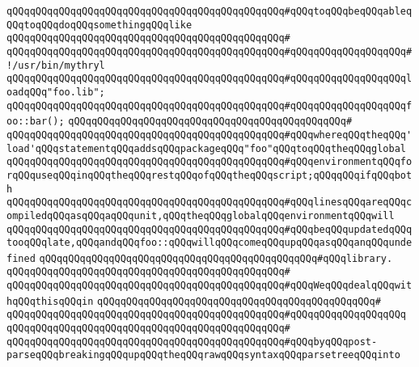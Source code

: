 \verb|qQQqqQQqqQQqqQQqqQQqqQQqqQQqqQQqqQQqqQQqqQQqqQQq#qQQqtoqQQqbeqQQqableqQQqtoqQQqdoqQQqsomethingqQQqlike|\newline
\verb|qQQqqQQqqQQqqQQqqQQqqQQqqQQqqQQqqQQqqQQqqQQqqQQq#|\newline
\verb|qQQqqQQqqQQqqQQqqQQqqQQqqQQqqQQqqQQqqQQqqQQqqQQq#qQQqqQQqqQQqqQQqqQQq#!/usr/bin/mythryl|\newline
\verb|qQQqqQQqqQQqqQQqqQQqqQQqqQQqqQQqqQQqqQQqqQQqqQQq#qQQqqQQqqQQqqQQqqQQqloadqQQq"foo.lib";|\newline
\verb|qQQqqQQqqQQqqQQqqQQqqQQqqQQqqQQqqQQqqQQqqQQqqQQq#qQQqqQQqqQQqqQQqqQQqfoo::bar();|\newline
\verb|qQQqqQQqqQQqqQQqqQQqqQQqqQQqqQQqqQQqqQQqqQQqqQQq#|\newline
\verb|qQQqqQQqqQQqqQQqqQQqqQQqqQQqqQQqqQQqqQQqqQQqqQQq#qQQqwhereqQQqtheqQQq'load'qQQqstatementqQQqaddsqQQqpackageqQQq"foo"qQQqtoqQQqtheqQQqglobal|\newline
\verb|qQQqqQQqqQQqqQQqqQQqqQQqqQQqqQQqqQQqqQQqqQQqqQQq#qQQqenvironmentqQQqforqQQquseqQQqinqQQqtheqQQqrestqQQqofqQQqtheqQQqscript;qQQqqQQqifqQQqboth|\newline
\verb|qQQqqQQqqQQqqQQqqQQqqQQqqQQqqQQqqQQqqQQqqQQqqQQq#qQQqlinesqQQqareqQQqcompiledqQQqasqQQqaqQQqunit,qQQqtheqQQqglobalqQQqenvironmentqQQqwill|\newline
\verb|qQQqqQQqqQQqqQQqqQQqqQQqqQQqqQQqqQQqqQQqqQQqqQQq#qQQqbeqQQqupdatedqQQqtooqQQqlate,qQQqandqQQqfoo::qQQqwillqQQqcomeqQQqupqQQqasqQQqanqQQqundefined|\newline
\verb|qQQqqQQqqQQqqQQqqQQqqQQqqQQqqQQqqQQqqQQqqQQqqQQq#qQQqlibrary.|\newline
\verb|qQQqqQQqqQQqqQQqqQQqqQQqqQQqqQQqqQQqqQQqqQQqqQQq#|\newline
\verb|qQQqqQQqqQQqqQQqqQQqqQQqqQQqqQQqqQQqqQQqqQQqqQQq#qQQqWeqQQqdealqQQqwithqQQqthisqQQqin|\newline
\verb|qQQqqQQqqQQqqQQqqQQqqQQqqQQqqQQqqQQqqQQqqQQqqQQq#|\newline
\verb|qQQqqQQqqQQqqQQqqQQqqQQqqQQqqQQqqQQqqQQqqQQqqQQq#qQQqqQQqqQQqqQQqqQQq|\newline
\verb|qQQqqQQqqQQqqQQqqQQqqQQqqQQqqQQqqQQqqQQqqQQqqQQq#|\newline
\verb|qQQqqQQqqQQqqQQqqQQqqQQqqQQqqQQqqQQqqQQqqQQqqQQq#qQQqbyqQQqpost-parseqQQqbreakingqQQqupqQQqtheqQQqrawqQQqsyntaxqQQqparsetreeqQQqinto|\newline

